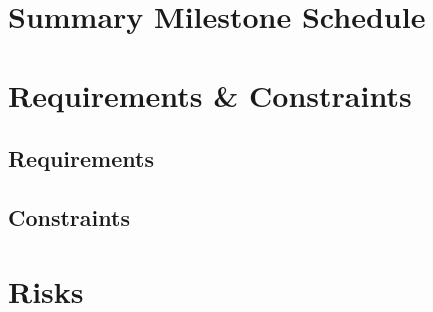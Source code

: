 \documentclass[12pt]{charter}
\begin{document}
\section*{Summary Milestone Schedule}
\label{sec:milestones}

\section*{Requirements \& Constraints}
\label{sec:require-n-constrain}
	\subsection*{Requirements}
	\label{subsec:requirements}
	
	\subsection*{Constraints}
	\label{subsec:constraints}

\section*{Risks}
\label{sec:risks}

\end{document}
